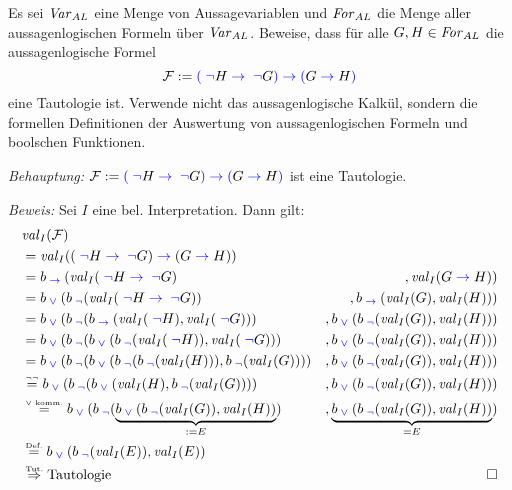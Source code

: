 \documentclass[a4paper]{article}
\begin{document}
Es sei $\hbox{\textit{Var}}_{AL}$ eine Menge von Aussagevariablen und $\hbox{\textit{For}}_{AL}$ die Menge aller aussagenlogischen Formeln über $\hbox{\textit{Var}}_{AL}$. Beweise, dass für alle \(G, H \in \hbox{\textit{For}}_{AL}\) die aussagenlogische Formel
				\[\mathcal{F} :=	\textcolor{blue}{(}\text{}{} \text{\;}\textcolor{blue}{\neg}\text{}{} H\text{\;}\textcolor{blue}{\to}\text{\;}{} \text{\;}\textcolor{blue}{\neg}\text{}{} G \textcolor{blue}{)}\text{}{} \text{\;}\textcolor{blue}{\to}\text{\;}{} \textcolor{blue}{(}\text{}{} G \text{\;}\textcolor{blue}{\to}\text{\;}{} H \textcolor{blue}{)}\text{}{}\]
		eine Tautologie ist. Verwende nicht das aussagenlogische Kalkül, sondern die formellen Definitionen der Auswertung von aussagenlogischen Formeln und boolschen Funktionen.

\emph{Behauptung:} \(\mathcal{F} :=	\textcolor{blue}{(}\text{}{} \text{\;}\textcolor{blue}{\neg}\text{}{} H\text{\;}\textcolor{blue}{\to}\text{\;}{} \text{\;}\textcolor{blue}{\neg}\text{}{} G \textcolor{blue}{)}\text{}{} \text{\;}\textcolor{blue}{\to}\text{\;}{} \textcolor{blue}{(}\text{}{} G \text{\;}\textcolor{blue}{\to}\text{\;}{} H \textcolor{blue}{)}\text{}{}\) ist eine Tautologie.

\emph{Beweis:} Sei $I$ eine bel. Interpretation. Dann gilt:
\begin{align*}
	&\vali{\mathcal{F}}\\
	&=\vali{(\bnot{} H \bimp{} \bnot{} G) \bimp{} (G \bimp{} H)}\\
	&=\bfimp{\vali{\bnot{} H \bimp{} \bnot{} G}&}{\vali{G\bimp{} H}}\\
	&=\bfor{\bfnot{\vali{\bnot{} H \bimp{} \bnot{} G}}&}%
		{\bfimp{\vali{G}}{\vali{H}}}\\
	&=\bfor{\bfnot{\bfimp{\vali{\bnot{} H}}{\vali{\bnot{} G}}}&}%
		{\bfor{\bfnot{\vali{G}}}{\vali{H}}}\\
	&=\bfor{\bfnot{\bfor{\bfnot{\vali{\bnot H}}}{\vali{\bnot G}}}&}%
	{\bfor{\bfnot{\vali{G}}}{\vali{H}}}\\
	&=\bfor{\bfnot{\bfor{\bfnot{\bfnot{\vali{H}}}}{\bfnot{\vali{G}}}}&}%
	{\bfor{\bfnot{\vali{G}}}{\vali{H}}}\\
	&\eqtext{$\neg\neg$}%
	\bfor{\bfnot{\bfor{\vali{H}}{\bfnot{\vali{G}}}}&}{\bfor{\bfnot{\vali{G}}}{\vali{H}}}\\
	&\eqtext{$\vee$ komm.}%
	\bfor{\bfnot{\underbrace{{\bfor{\bfnot{\vali{G}}}{\vali{H}}}}_{:=E}}&}{\underbrace{{\bfor{\bfnot{\vali{G}}}{\vali{H}}}}_{=E}}\\
	&\eqtext{Def.} \bfor{\bfnot{\vali{E}}}{\vali{E}}\\
	&\imptext{Tut.} \text{Tautologie} & \qedwhite
\end{align*}

\end{document}
